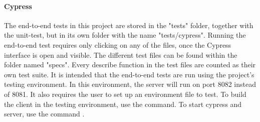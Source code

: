 \paragraph{Cypress}
The end-to-end tests in this project are stored in the "tests" folder, together with the unit-test, but in its own folder with the name "tests/cypress". Running the end-to-end test requires only clicking on any of the files, once the Cypress interface is open and visible. The different test files can be found within the folder named "specs". Every describe function in the test files are counted as their own test suite. It is intended that the end-to-end tests are run using the project's testing environment. In this environment, the server will run on port 8082 instead of 8081. It also requires the user to set up an environment file to test. To build the client in the testing environment, use the  command. To start cypress and server, use the command .